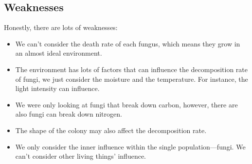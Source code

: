 \documentclass{mcmthesis}
\begin{document}
\subsection{Weaknesses}
Honestly, there are lots of weaknesses:
\begin{itemize}
  \item We can't consider the death rate of each fungus, which means they grow in an almost ideal environment.
  \item The environment has lots of factors that can influence the decomposition rate of fungi, we just consider the moisture and the temperature.
  For instance, the light intensity can influence.
  \item We were only looking at fungi that break down carbon, however, there are also fungi can break down nitrogen.
  \item The shape of the colony may also affect the decomposition rate.
  \item We only consider the inner influence within the single population---fungi. We can't consider other living things' influence.
\end{itemize}

\medskip




\newpage
\end{document}
